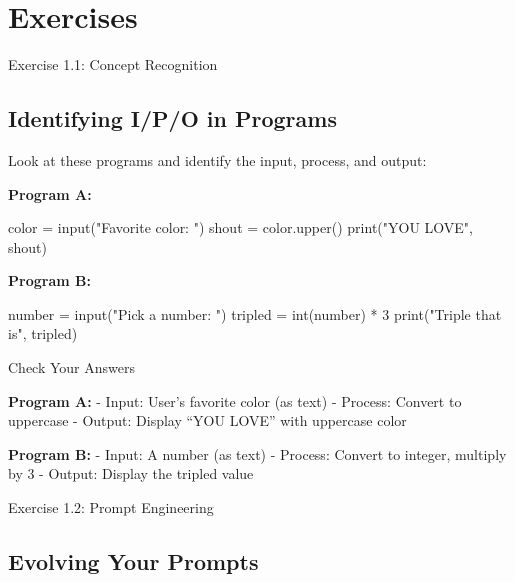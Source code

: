 \documentclass[
  letterpaper,
  DIV=11,
  numbers=noendperiod,
  oneside]{scrreprt}
\newenvironment{Shaded}{}{}
\newcommand{\BuiltInTok}[1]{\textcolor[rgb]{0.84,0.23,0.29}{#1}}
\newcommand{\DecValTok}[1]{\textcolor[rgb]{0.00,0.36,0.77}{#1}}
\newcommand{\NormalTok}[1]{\textcolor[rgb]{0.14,0.16,0.18}{#1}}
\newcommand{\OperatorTok}[1]{\textcolor[rgb]{0.14,0.16,0.18}{#1}}
\newcommand{\StringTok}[1]{\textcolor[rgb]{0.01,0.18,0.38}{#1}}
\begin{document}
\section{Exercises}\label{exercises-1}

Exercise 1.1: Concept Recognition

\subsection{Identifying I/P/O in
Programs}\label{identifying-ipo-in-programs}

Look at these programs and identify the input, process, and output:

\textbf{Program A:}

\begin{Shaded}
\begin{Highlighting}[]
\NormalTok{color }\OperatorTok{=} \BuiltInTok{input}\NormalTok{(}\StringTok{"Favorite color: "}\NormalTok{)}
\NormalTok{shout }\OperatorTok{=}\NormalTok{ color.upper()}
\BuiltInTok{print}\NormalTok{(}\StringTok{"YOU LOVE"}\NormalTok{, shout)}
\end{Highlighting}
\end{Shaded}

\textbf{Program B:}

\begin{Shaded}
\begin{Highlighting}[]
\NormalTok{number }\OperatorTok{=} \BuiltInTok{input}\NormalTok{(}\StringTok{"Pick a number: "}\NormalTok{)}
\NormalTok{tripled }\OperatorTok{=} \BuiltInTok{int}\NormalTok{(number) }\OperatorTok{*} \DecValTok{3}
\BuiltInTok{print}\NormalTok{(}\StringTok{"Triple that is"}\NormalTok{, tripled)}
\end{Highlighting}
\end{Shaded}

Check Your Answers

\textbf{Program A:} - Input: User's favorite color (as text) - Process:
Convert to uppercase - Output: Display ``YOU LOVE'' with uppercase color

\textbf{Program B:} - Input: A number (as text) - Process: Convert to
integer, multiply by 3 - Output: Display the tripled value

Exercise 1.2: Prompt Engineering

\subsection{Evolving Your Prompts}\label{evolving-your-prompts}
\end{document}
